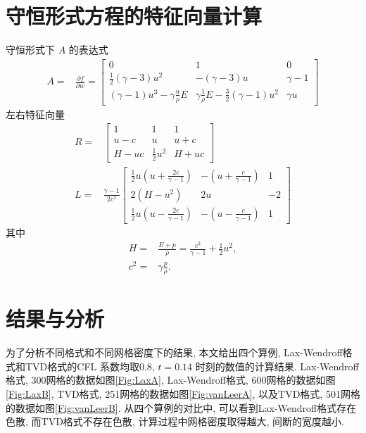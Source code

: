 \documentclass[10.5pt
]{article}
\begin{document}
\section{守恒形式方程的特征向量计算}\label{Appendix}
守恒形式下 $A$ 的表达式
\begin{align*}
A =& \frac{\partial f}{\partial w} = \left[\begin{array}{ccc} 0 & 1 & 0
\\
\frac{1}{2} (\gamma  - 3) u^2 & -(\gamma - 3) u & \gamma - 1
\\
(\gamma - 1) u^3 - \gamma \frac{u}{\rho} E & \gamma \frac{1}{\rho} E-\frac{3}{2} (\gamma
- 1) u^2 & \gamma u
\end{array}
\right]
\end{align*}
左右特征向量
\begin{align*}
R =& \left[\begin{array}{ccc} 1 & 1 & 1
\\
u - c & u & u + c
\\
H - u c & \frac{1}{2} u^2 & H + u c
\end{array}
\right]
\\
L =& \frac{\gamma - 1}{2 c^2} \left[\begin{array}{ccc} \frac{1}{2} u \left(u + \frac{2
	c}{\gamma - 1}\right) & -\left(u + \frac{c}{\gamma - 1}\right) & 1
\\
2(H - u^2) & 2 u & - 2
\\
\frac{1}{2} u \left(u - \frac{2 c}{\gamma - 1}\right) & -\left(u - \frac{c}{\gamma -
	1}\right) & 1
\end{array}
\right]
\end{align*}
其中
\begin{align*}
H =& \frac{E + p}{\rho} = \frac{c^2}{\gamma - 1} + \frac{1}{2} u^2,
\\
c^2 =& \gamma \frac{p}{\rho}.
\end{align*}

\section{结果与分析}
为了分析不同格式和不同网格密度下的结果, 本文给出四个算例, Lax-Wendroff格式和TVD格式的CFL 系数均取0.8, $t=0.14$ 时刻的数值的计算结果. Lax-Wendroff格式, 300网格的数据如图\ref{Fig:LaxA}, Lax-Wendroff格式, 600网格的数据如图\ref{Fig:LaxB}, TVD格式, 251网格的数据如图\ref{Fig:vanLeerA}, 以及TVD格式, 501网格的数据如图\ref{Fig:vanLeerB}. 从四个算例的对比中, 可以看到Lax-Wendroff格式存在色散, 而TVD格式不存在色散, 计算过程中网格密度取得越大, 间断的宽度越小.
\end{document}
